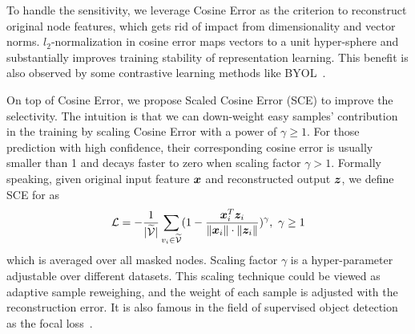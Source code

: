 {To handle the sensitivity, we leverage Cosine Error as the criterion to reconstruct original node features, which gets rid of impact from dimensionality and vector norms. 
$l_2$-normalization in cosine error maps vectors to a unit hyper-sphere and substantially improves training stability of representation learning. This benefit is also observed by some contrastive learning methods like BYOL~\cite{grill2020bootstrap}. 

On top of Cosine Error, we propose Scaled Cosine Error (SCE) to improve the selectivity. The intuition is that we can down-weight easy samples' contribution in the training by scaling Cosine Error with a power of $\gamma\ge 1$. For those prediction with high confidence, their corresponding cosine error is usually smaller than 1 and decays faster to zero when scaling factor $\gamma>1$. Formally speaking, given original input feature ${\bm{x}}$ and reconstructed output ${\bm{z}}$, we define SCE for \model as
\begin{equation}
    \mathcal{L} = -\frac{1}{|\widetilde{\mathcal{V}}|} \sum_{v_i \in \widetilde{\mathcal{V}}} (1 - \frac{{\bm{x}}^T_i {\bm{z}}_i}{\| {\bm{x}}_i\| \cdot \| {\bm{z}}_i\|})^\gamma,~ \gamma \ge 1
    \label{eq:loss}
\end{equation}
\noindent which is averaged over all masked nodes. Scaling factor $\gamma$ is a hyper-parameter adjustable over different datasets.
This scaling technique could be viewed as adaptive sample reweighing, and the weight of each sample is adjusted with the reconstruction error. It is also famous in the field of supervised object detection as the focal loss~\cite{lin2017focal}.







}
